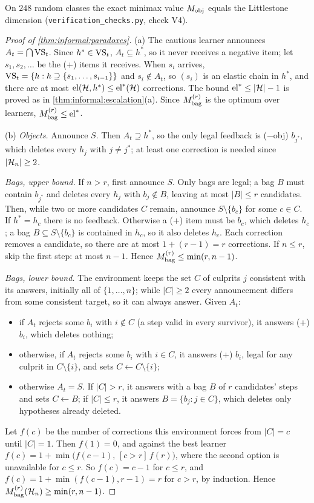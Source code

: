 On $248$ random classes the exact minimax value $M_{\mathrm{obj}}$ equals the Littlestone dimension  (\texttt{verification\_checks.py}, check V4).

\begin{proof}[Proof of \cref{thm:informal:paradoxes}]
(a) The cautious learner announces $A_t=\bigcap\mathrm{VS}_t$. Since $h^*\in\mathrm{VS}_t$, $A_t\subseteq h^*$, so it never receives a negative item; let $s_1,s_2,\dots$ be the (+) items it receives. When $s_i$ arrives, $\mathrm{VS}_t=\{h:h\supseteq\{s_1,\dots,s_{i-1}\}\}$ and $s_i\notin A_t$, so $(s_i)$ is an elastic chain in $h^*$, and there are at most $\mathrm{el}(\mathcal{H},h^*)\le\mathrm{el}^*(\mathcal{H})$ corrections. The bound $\mathrm{el}^*\le|\mathcal{H}|-1$ is proved as in \cref{thm:informal:escalation}(a). Since $M^{(r)}_{\mathrm{bag}}$ is the optimum over learners, $M^{(r)}_{\mathrm{bag}}\le\mathrm{el}^*$.

(b) \emph{Objects.} Announce $S$. Then $A_t\supseteq h^*$, so the only legal feedback is (\(-\)obj) $b_{j^*}$, which deletes every $h_j$ with $j\ne j^*$; at least one correction is needed since $|\mathcal{H}_n|\ge2$.

\emph{Bags, upper bound.} If $n>r$, first announce $S$. Only bags are legal; a bag $B$ must contain $b_{j^*}$ and deletes every $h_j$ with $b_j\notin B$, leaving at most $|B|\le r$ candidates. Then, while two or more candidates $C$ remain, announce $S\setminus\{b_c\}$ for some $c\in C$. If $h^*=h_c$ there is no feedback. Otherwise a (+) item must be $b_c$, which deletes $h_c$; a bag $B\subseteq S\setminus\{b_c\}$ is contained in $h_c$, so it also deletes $h_c$. Each correction removes a candidate, so there are at most $1+(r-1)=r$ corrections. If $n\le r$, skip the first step: at most $n-1$. Hence $M^{(r)}_{\mathrm{bag}}\le\min(r,n-1)$.

\emph{Bags, lower bound.} The environment keeps the set $C$ of culprits $j$ consistent with its answers, initially all of $\{1,\dots,n\}$; while $|C|\ge2$ every announcement differs from some consistent target, so it can always answer. Given $A_t$:
\begin{itemize}
\item if $A_t$ rejects some $b_i$ with $i\notin C$ (a step valid in every survivor), it answers (+) $b_i$, which deletes nothing;
\item otherwise, if $A_t$ rejects some $b_i$ with $i\in C$, it answers (+) $b_i$, legal for any culprit in $C\setminus\{i\}$, and sets $C\leftarrow C\setminus\{i\}$;
\item otherwise $A_t=S$. If $|C|>r$, it answers with a bag $B$ of $r$ candidates' steps and sets $C\leftarrow B$; if $|C|\le r$, it answers $B=\{b_j:j\in C\}$, which deletes only hypotheses already deleted.
\end{itemize}
Let $f(c)$ be the number of corrections this environment forces from $|C|=c$ until $|C|=1$. Then $f(1)=0$, and against the best learner $f(c)=1+\min\big(f(c-1),\,[c>r]\,f(r)\big)$, where the second option is unavailable for $c\le r$. So $f(c)=c-1$ for $c\le r$, and $f(c)=1+\min(f(c-1),r-1)=r$ for $c>r$, by induction. Hence $M^{(r)}_{\mathrm{bag}}(\mathcal{H}_n)\ge\min(r,n-1)$.


\end{proof}
